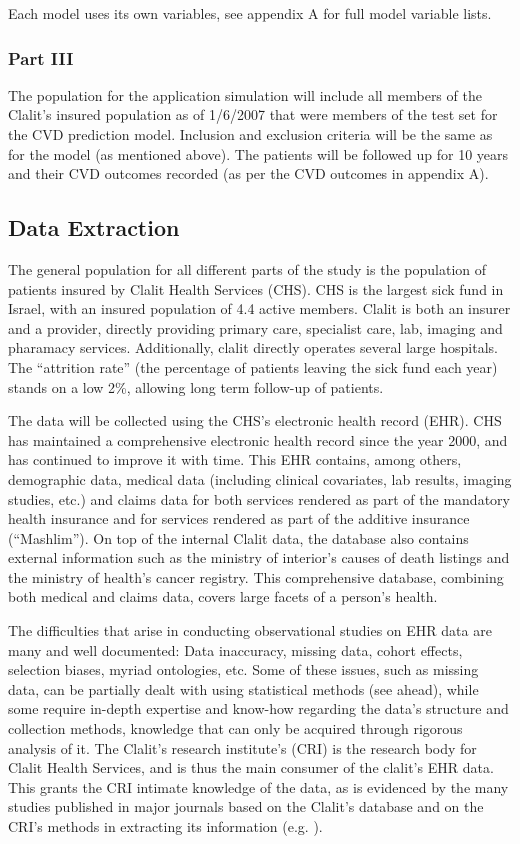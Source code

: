 \documentclass[a4paper,12pt]{article}
\begin{document}
		Each model uses its own variables, see appendix A for full model variable lists.
		
		\subsubsection{Part III}
		The population for the application simulation will include all members of the Clalit's insured population as of 1/6/2007 that were members of the test set for the CVD prediction model. Inclusion and exclusion criteria will be the same as for the model (as mentioned above). The patients will be followed up for 10 years and their CVD outcomes recorded (as per the CVD outcomes in appendix A).
	
	\subsection{Data Extraction}
	The general population for all different parts of the study is the population of patients insured by Clalit Health Services (CHS). CHS is the largest sick fund in Israel, with an insured population of 4.4 active members. Clalit is both an insurer and a provider, directly providing primary care, specialist care, lab, imaging and pharamacy services. Additionally, clalit directly operates several large hospitals. The “attrition rate” (the percentage of patients leaving the sick fund each year) stands on a low 2\%, allowing long term follow-up of patients.
	
	The data will be collected using the CHS's electronic health record (EHR). CHS has maintained a comprehensive electronic health record since the year 2000, and has continued to improve it with time. This EHR contains, among others, demographic data, medical data (including clinical covariates, lab results, imaging studies, etc.) and claims data for both services rendered as part of the mandatory health insurance and for services rendered as part of the additive insurance (“Mashlim”). On top of the internal Clalit data, the database also contains external information such as the ministry of interior's causes of death listings and the ministry of health's cancer registry. This comprehensive database, combining both medical and claims data, covers large facets of a person's health.
	
	The difficulties that arise in conducting observational studies on EHR data are many and well documented: Data inaccuracy, missing data, cohort effects, selection biases, myriad ontologies, etc\cite{Hripcsak2011,Jensen2012,Goldstein2017}. Some of these issues, such as missing data, can be partially dealt with using statistical methods (see ahead), while some require in-depth expertise and know-how regarding the data's structure and collection methods, knowledge that can only be acquired through rigorous analysis of it. The Clalit's research institute's (CRI) is the research body for Clalit Health Services, and is thus the main consumer of the clalit's EHR data. This grants the CRI intimate knowledge of the data, as is evidenced by the many studies published in major journals based on the Clalit's database and on the CRI's methods in extracting its information (e.g. \cite{Reges2018,Dagan2017}).
	
\end{document}
